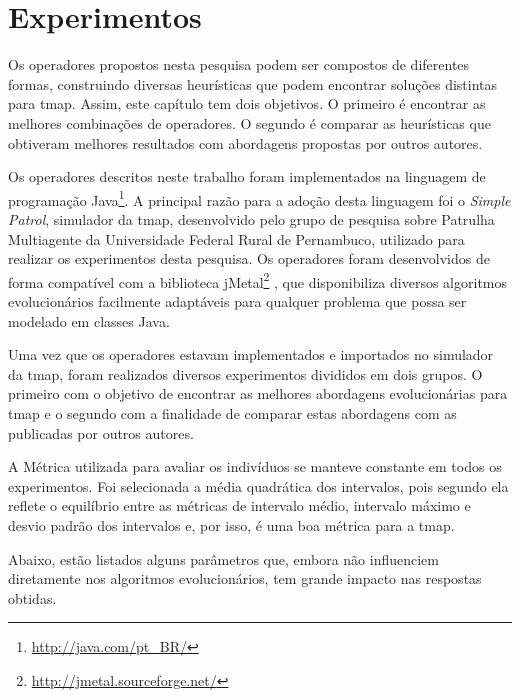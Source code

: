 \chapter{Experimentos}
\label{experimentos}

Os operadores propostos nesta pesquisa podem ser compostos de diferentes formas, 
construindo diversas heurísticas que podem encontrar soluções distintas para 
\ac{tmap}. Assim, este capítulo tem dois objetivos. O primeiro é encontrar as 
melhores combinações de operadores. O segundo é comparar as heurísticas que 
obtiveram melhores resultados com abordagens propostas por outros autores.

Os operadores descritos neste trabalho foram implementados na linguagem de 
programação Java\footnote{\url{http://java.com/pt_BR/}}. A principal razão para 
a adoção desta linguagem foi o \textit{Simple Patrol}, simulador da \ac{tmap}, 
desenvolvido pelo grupo de pesquisa sobre Patrulha Multiagente da Universidade 
Federal Rural de Pernambuco, utilizado para realizar os experimentos desta 
pesquisa. Os operadores foram desenvolvidos de forma compatível com a biblioteca 
jMetal\footnote{\url{http://jmetal.sourceforge.net/}} \citep{Durillo2011}, que 
disponibiliza diversos algoritmos evolucionários facilmente adaptáveis para 
qualquer problema que possa ser modelado em classes Java.

Uma vez que os operadores estavam implementados e importados no simulador da 
\ac{tmap}, foram realizados diversos experimentos divididos em dois grupos. O 
primeiro com o objetivo de encontrar as melhores abordagens evolucionárias para 
\ac{tmap} e o segundo com a finalidade de comparar estas abordagens com as 
publicadas por outros autores.

A Métrica utilizada para avaliar os indivíduos se manteve constante em todos 
os experimentos. Foi selecionada a média quadrática dos intervalos, pois segundo 
\citep{sampaiophd} ela reflete o equilíbrio entre as métricas de intervalo 
médio, intervalo máximo e desvio padrão dos intervalos e, por isso, é uma boa 
métrica para a \ac{tmap}.

Abaixo, estão listados alguns parâmetros que, embora não influenciem diretamente 
nos algoritmos evolucionários, tem grande impacto nas respostas obtidas.

